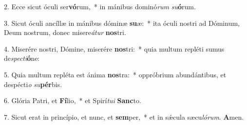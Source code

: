 2. Ecce sicut óculi ser\textbf{vó}rum,~*  in mánibus dominó\textit{rum} \textit{su}\textbf{ó}rum.\

3. Sicut óculi ancíllæ in mánibus dóminæ \textbf{su}æ:~*  ita óculi nostri ad Dóminum, Deum nostrum, donec misere\textit{á}\textit{tur} \textbf{nos}tri.\

4. Miserére nostri, Dómine, miserére \textbf{nos}tri:~*  quia multum repléti sumus de\textit{spec}\textit{ti}\textbf{ó}ne:\

5. Quia multum repléta est ánima \textbf{nos}tra:~*  oppróbrium abundántibus, et despécti\textit{o} \textit{su}\textbf{pér}bis.\

6. Glória Patri, et \textbf{Fí}lio,~*  et Spirí\textit{tu}\textit{i} \textbf{Sanc}to.\

7. Sicut erat in princípio, et nunc, et \textbf{sem}per,~*  et in sǽcula sæcu\textit{ló}\textit{rum}. \textbf{A}men.\

